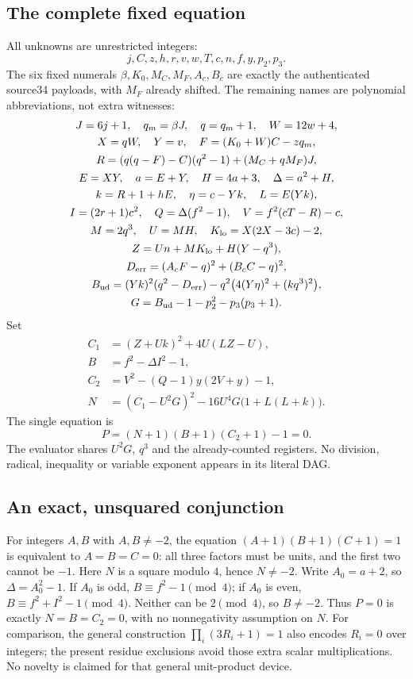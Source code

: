 \documentclass[11pt]{article}
\begin{document}
\subsection{The complete fixed equation}
All unknowns are unrestricted integers:
\[
 j,C,z,h,r,v,w,T,c,n,f,y,p_2,p_3.
\]
The six fixed numerals $\beta,K_0,M_C,M_F,A_c,B_c$ are exactly the authenticated
source34 payloads, with $M_F$ already shifted. The remaining names are polynomial
abbreviations, not extra witnesses:
\begin{gather*}
 J=6j+1,\quad q_m=\beta J,\quad q=q_m+1,\quad W=12w+4,\\
 X=qW,\quad Y=v,\quad F=(K_0+W)C-zq_m,\\
 R=(q(q-F)-C)(q^2-1)+(M_C+qM_F)J,\\
 E=XY,\quad a=E+Y,\quad H=4a+3,\quad\Delta=a^2+H,\\
 k=R+1+hE,\quad \eta=c-Yk,\quad L=E(Yk),\\
 I=(2r+1)c^2,\quad Q=\Delta(f^2-1),\quad V=f^2(cT-R)-c,\\
 M=2q^3,\quad U=MH,\quad K_{\rm lo}=X(2X-3c)-2,\\
 Z=Un+MK_{\rm lo}+H(Y-q^3),\\
 D_{\rm err}=(A_cF-q)^2+(B_cC-q)^2,\\
 B_{\rm ud}=(Yk)^2(q^2-D_{\rm err})
       -q^2\bigl(4(Y\eta)^2+(kq^3)^2\bigr),\\
 G=B_{\rm ud}-1-p_2^2-p_3(p_3+1).
\end{gather*}
Set
\begin{align*}
 C_1&=(Z+Uk)^2+4U(LZ-U),\\
 B&=f^2-\Delta I^2-1,\\
 C_2&=V^2-(Q-1)y(2V+y)-1,\\
 N&=(C_1-U^2G)^2-16U^4G\bigl(1+L(L+k)\bigr).
\end{align*}
The single equation is
\[
 \boxed{P=(N+1)(B+1)(C_2+1)-1=0.}
\]
The evaluator shares $U^2G$, $q^3$ and the already-counted registers. No division,
radical, inequality or variable exponent appears in its literal DAG.

\subsection{An exact, unsquared conjunction}
For integers $A,B$ with $A,B\ne-2$, the equation
$(A+1)(B+1)(C+1)=1$ is equivalent to $A=B=C=0$: all three factors must be units,
and the first two cannot be $-1$.
Here $N$ is a square modulo $4$, hence $N\ne-2$. Write $A_0=a+2$, so
$\Delta=A_0^2-1$. If $A_0$ is odd, $B\equiv f^2-1\pmod4$; if $A_0$ is even,
$B\equiv f^2+I^2-1\pmod4$. Neither can be $2\pmod4$, so $B\ne-2$.
Thus $P=0$ is exactly $N=B=C_2=0$, with no nonnegativity assumption on $N$.
For comparison, the general construction $\prod_i(3R_i+1)=1$ also encodes
$R_i=0$ over integers; the present residue exclusions avoid those extra scalar
multiplications. No novelty is claimed for that general unit-product device.
\end{document}
